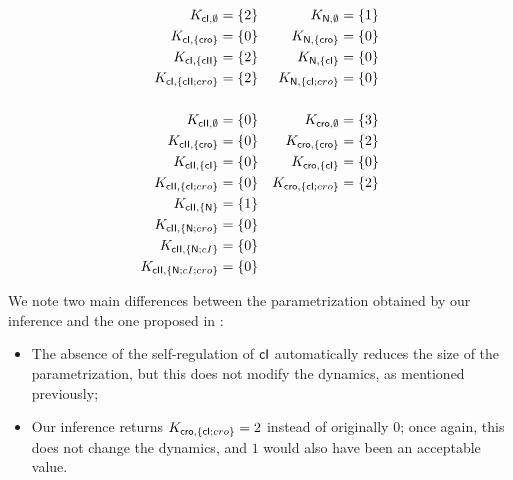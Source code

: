 \begin{table}[t]
\begin{align*}
  K_{\mathsf{cI}, \emptyset} &= \{2\} &
  K_{\mathsf{N}, \emptyset} &= \{1\} \\
  K_{\mathsf{cI}, \{\mathsf{cro}\}} &= \{0\} &
  K_{\mathsf{N}, \{\mathsf{cro}\}} &= \{0\} \\
  K_{\mathsf{cI}, \{\mathsf{cII}\}} &= \{2\} &
  K_{\mathsf{N}, \{\mathsf{cI}\}} &= \{0\} \\
  K_{\mathsf{cI}, \{\mathsf{cII};cro\}} &= \{2\} &
  K_{\mathsf{N}, \{\mathsf{cI};cro\}} &= \{0\} \\
  \\
  K_{\mathsf{cII}, \emptyset} &= \{0\} &
  K_{\mathsf{cro}, \emptyset} &= \{3\} \\
  K_{\mathsf{cII}, \{\mathsf{cro}\}} &= \{0\} &
  K_{\mathsf{cro}, \{\mathsf{cro}\}} &= \{2\} \\
  K_{\mathsf{cII}, \{\mathsf{cI}\}} &= \{0\} &
  K_{\mathsf{cro}, \{\mathsf{cI}\}} &= \{0\} \\
  K_{\mathsf{cII}, \{\mathsf{cI};cro\}} &= \{0\} &
  K_{\mathsf{cro}, \{\mathsf{cI};cro\}} &= \{2\} \\
  K_{\mathsf{cII}, \{\mathsf{N}\}} &= \{1\} \\
  K_{\mathsf{cII}, \{\mathsf{N};cro\}} &= \{0\} \\
  K_{\mathsf{cII}, \{\mathsf{N};cI\}} &= \{0\} \\
  K_{\mathsf{cII}, \{\mathsf{N};cI;cro\}} &= \{0\}
\end{align*}
\caption{\label{tb:phage-lambda-k}%
  Result of the parameters inference performed on the Process Hitting model
  of the phage lambda immunity response
  taken from \cite{thieffry_dynamical_1995}.
}
\end{table}

We note two main differences between the parametrization obtained by our inference
and the one proposed in \cite{thieffry_dynamical_1995}:
\begin{itemize}
  \item The absence of the self-regulation of $\mathsf{cI}$ automatically reduces the size
    of the parametrization, but this does not modify the dynamics, as mentioned previously;
  \item Our inference returns $K_{\mathsf{cro}, \{\mathsf{cI};cro\}} = 2$ instead of originally $0$;
    once again, this does not change the dynamics, and $1$ would also have been
    an acceptable value.
\end{itemize}
